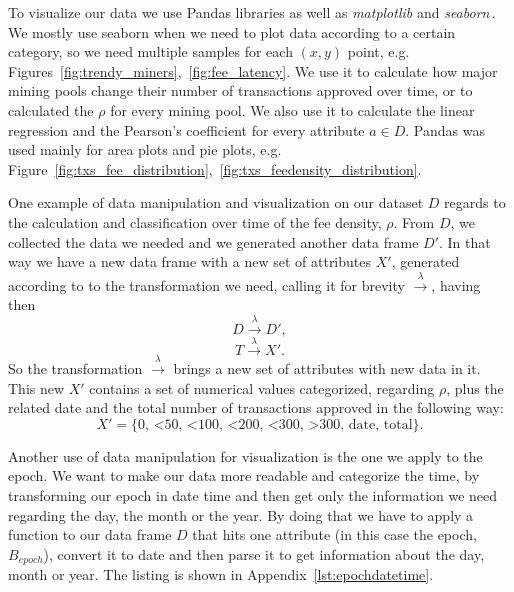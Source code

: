 \documentclass[USenglish]{uit-thesis}
\begin{document}
To visualize our data we use Pandas libraries
as well as \emph{matplotlib} and
\emph{seaborn}\,\cite{pandas, matplotlib, michael_waskom_seaborn}.
We mostly use seaborn when we need to plot data
according to a certain category, so we need multiple
samples for each $(x,y)$ point, e.g.
Figures~\ref{fig:trendy_miners},~\ref{fig:fee_latency}.
We use it to
calculate how major mining pools change their
number of transactions approved over time, or to
calculated the $\rho$ for every mining pool. We also
use it to calculate the linear regression and the Pearson's
coefficient for every attribute $a \in D$.
Pandas was used mainly for area plots and pie plots,
e.g. Figure~\ref{fig:txs_fee_distribution},~\ref{fig:txs_feedensity_distribution}.

One example of data manipulation and visualization on our
dataset $D$ regards to the calculation and classification
over time of the fee density, $\rho$. From $D$, we collected
the data we needed and we generated another data frame $D'$.
In that way we have a new data frame with a new set of attributes
$X'$, generated according to to the transformation
we need, calling it for brevity
$\xrightarrow{\text{$\lambda$}}$, having then
\[
D \xrightarrow{\text{$\lambda$}} D',
\]
\[
T \xrightarrow{\text{$\lambda$}} X'.
\]
So the transformation $\xrightarrow{\text{$\lambda$}}$ brings a new set
of attributes with new data in it.
This new $X'$ contains a set of numerical values categorized, 
regarding $\rho$,
plus the related date and the total number of transactions approved in
the following way:
\[
X' = \{\text{0, <50, <100, <200, <300, >300, date, total} \}.
\]

Another use of data manipulation for visualization is the one we apply to
the epoch. We want to make our data more readable and categorize the
time, by transforming
our epoch in date time and then get only the information we need
regarding the day, the month or the year. By doing that we have to
apply a function to our data frame $D$ that hits one attribute
(in this case the epoch, $B_{epoch}$), convert it to date
and then parse it to get information about the day, month or year.
The listing is shown in Appendix~\ref{lst:epochdatetime}.
\end{document}
